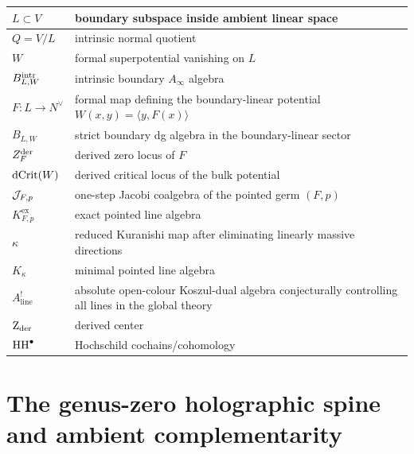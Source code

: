 \begin{center}
\renewcommand{\arraystretch}{1.2}
\begin{longtable}{|p{}|p{}|}
\hline
$L\subset V$ & boundary subspace inside ambient linear space \\
\hline
$Q=V/L$ & intrinsic normal quotient \\
\hline
$W$ & formal superpotential vanishing on $L$ \\
\hline
$B^{\mathrm{intr}}_{L,W}$ & intrinsic boundary $A_\infty$ algebra \\
\hline
$F:L\to N^\vee$ & formal map defining the boundary-linear potential $W(x,y)=\langle y,F(x)\rangle$ \\
\hline
$B_{L,W}$ & strict boundary dg algebra in the boundary-linear sector \\
\hline
$Z_F^{\mathrm{der}}$ & derived zero locus of $F$ \\
\hline
$\operatorname{dCrit}(W)$ & derived critical locus of the bulk potential \\
\hline
$\mathcal J_{F,p}$ & one-step Jacobi coalgebra of the pointed germ $(F,p)$ \\
\hline
$K^{\mathrm{ex}}_{F,p}$ & exact pointed line algebra \\
\hline
$\kappa$ & reduced Kuranishi map after eliminating linearly massive directions \\
\hline
$K_\kappa$ & minimal pointed line algebra \\
\hline
$A^!_{\mathrm{line}}$ & absolute open-colour Koszul-dual algebra conjecturally controlling all lines in the global theory \\
\hline
$\operatorname{Z}_{\mathrm{der}}$ & derived center \\
\hline
$\operatorname{HH}^\bullet$ & Hochschild cochains/cohomology \\
\hline
\end{longtable}
\end{center}




\section{The genus-zero holographic spine and ambient complementarity}
\label{sec:genus-zero-holographic-spine}

